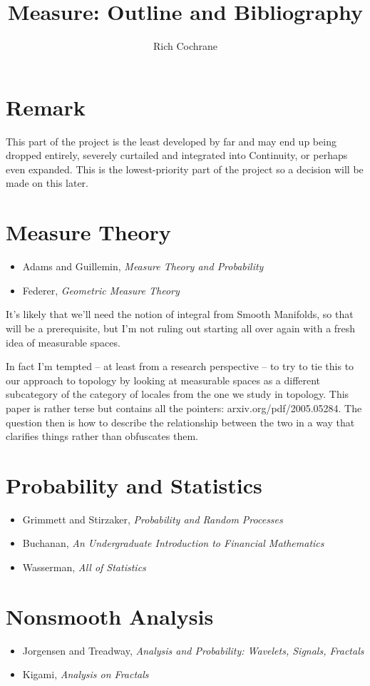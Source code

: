 \documentclass[article]{article}
\begin{document}
	
	\title{Measure: Outline and Bibliography}
	\author{Rich Cochrane}
	\maketitle
	
\section*{Remark}

This part of the project is the least developed by far and may end up being dropped entirely, severely curtailed and integrated into Continuity, or perhaps even expanded. This is the lowest-priority part of the project so a decision will be made on this later.


\section{Measure Theory}

\begin{itemize}
	\item{Adams and Guillemin, \textit{Measure Theory and Probability}}
	\item{Federer, \textit{Geometric Measure Theory}}
\end{itemize}

It's likely that we'll need the notion of integral from Smooth Manifolds, so that will be a prerequisite, but I'm not ruling out starting all over again with a fresh idea of measurable spaces.

In fact I'm tempted -- at least from a research perspective -- to try to tie this to our approach to topology by looking at measurable spaces as a different subcategory of the category of locales from the one we study in topology. This paper is rather terse but contains all the pointers: arxiv.org/pdf/2005.05284. The question then is how to describe the relationship between the two in a way that clarifies things rather than obfuscates them.

\section{Probability and Statistics}

\begin{itemize}
	\item{Grimmett and Stirzaker, \textit{Probability and Random Processes}}
	\item{Buchanan, \textit{An Undergraduate Introduction to Financial Mathematics}}
	\item{Wasserman, \textit{All of Statistics}}
\end{itemize}

\section{Nonsmooth Analysis}

\begin{itemize}
	\item{Jorgensen and Treadway, \textit{Analysis and Probability: Wavelets, Signals, Fractals}}
	\item{Kigami, \textit{Analysis on Fractals}}
\end{itemize}


	
\end{document}
